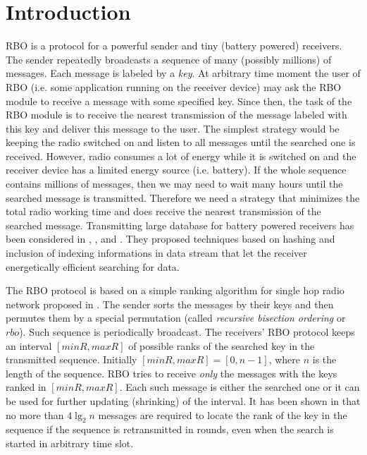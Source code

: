 \documentclass{llncs}
\begin{document}
\section{Introduction}
RBO is a protocol for a powerful sender and tiny (battery powered) receivers.
The sender repeatedly broadcasts a sequence of many (possibly millions) of messages.
Each message is labeled by a {\em key}.
At arbitrary time moment the user of RBO 
(i.e. some application running on the receiver device)
may ask the RBO module to receive a message with some specified key.
Since then, the task of the RBO module is to receive the nearest transmission 
of the  message labeled with this key and deliver this message to the user.
The simplest strategy would be keeping the radio switched on and listen to all
messages until the searched one is received.
However, radio consumes a lot of energy while it is switched on and the receiver 
device has a limited energy source (i.e. battery).
If the whole sequence contains millions of messages, then
we may need to wait many hours until the searched message is transmitted.
Therefore we need a strategy that minimizes the total radio working time
and does receive the nearest transmission of the searched message. 
Transmitting large database for battery powered
receivers has been considered in 
\cite{DBLP:conf/sigmod/ImielinskiVB94},
\cite{DBLP:conf/edbt/ImielinskiVB94},
and 
\cite{DBLP:journals/tkde/ImielinskiVB97}.
They proposed techniques based on hashing and inclusion of
indexing informations in data stream that let the receiver 
energetically efficient searching for data. 

The RBO protocol is based on a simple ranking algorithm
for single hop radio network proposed in \cite{DBLP:conf/adhoc-now/Kik08}.
The sender sorts the messages by their keys and then permutes them by a special permutation
(called {\em recursive bisection ordering} or {\em $rbo$}).
Such sequence is periodically broadcast.
The receivers' RBO protocol 
keeps an interval $[minR, maxR]$ of possible ranks of the searched key 
in the transmitted sequence.
Initially $[minR, maxR]=[0, n-1]$, where $n$ is the length of the sequence.
RBO tries to receive {\em only} the messages with the keys ranked in $[minR, maxR]$.
Each such message is either the searched one
or it can be used for further updating (shrinking) of the interval.
It has been shown in \cite{DBLP:conf/adhoc-now/Kik08} that 
no more than $4\lg_2 n$
messages are required to locate the rank of the
key in the sequence if the sequence is retransmitted in rounds,
even when the search is started in arbitrary time slot.
\end{document}
